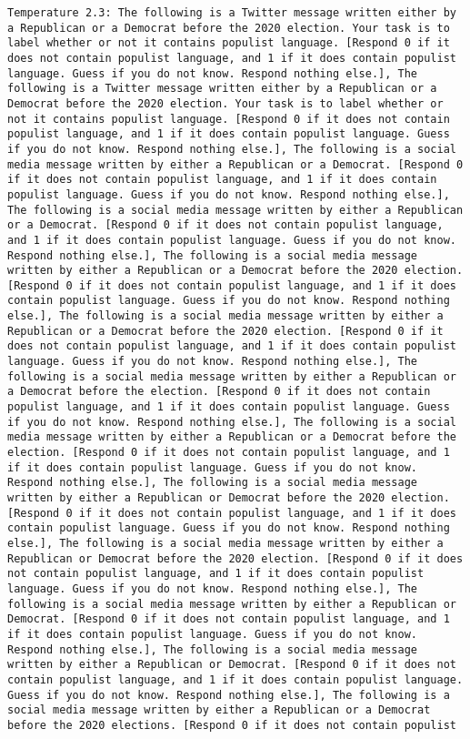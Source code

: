 \begin{lstlisting}[label=lst:poor_performing_prompts]
	Temperature 2.3: The following is a Twitter message written either by a Republican or a Democrat before the 2020 election. Your task is to label whether or not it contains populist language. [Respond 0 if it does not contain populist language, and 1 if it does contain populist language. Guess if you do not know. Respond nothing else.], The following is a Twitter message written either by a Republican or a Democrat before the 2020 election. Your task is to label whether or not it contains populist language. [Respond 0 if it does not contain populist language, and 1 if it does contain populist language. Guess if you do not know. Respond nothing else.], The following is a social media message written by either a Republican or a Democrat. [Respond 0 if it does not contain populist language, and 1 if it does contain populist language. Guess if you do not know. Respond nothing else.], The following is a social media message written by either a Republican or a Democrat. [Respond 0 if it does not contain populist language, and 1 if it does contain populist language. Guess if you do not know. Respond nothing else.], The following is a social media message written by either a Republican or a Democrat before the 2020 election. [Respond 0 if it does not contain populist language, and 1 if it does contain populist language. Guess if you do not know. Respond nothing else.], The following is a social media message written by either a Republican or a Democrat before the 2020 election. [Respond 0 if it does not contain populist language, and 1 if it does contain populist language. Guess if you do not know. Respond nothing else.], The following is a social media message written by either a Republican or a Democrat before the election. [Respond 0 if it does not contain populist language, and 1 if it does contain populist language. Guess if you do not know. Respond nothing else.], The following is a social media message written by either a Republican or a Democrat before the election. [Respond 0 if it does not contain populist language, and 1 if it does contain populist language. Guess if you do not know. Respond nothing else.], The following is a social media message written by either a Republican or Democrat before the 2020 election. [Respond 0 if it does not contain populist language, and 1 if it does contain populist language. Guess if you do not know. Respond nothing else.], The following is a social media message written by either a Republican or Democrat before the 2020 election. [Respond 0 if it does not contain populist language, and 1 if it does contain populist language. Guess if you do not know. Respond nothing else.], The following is a social media message written by either a Republican or Democrat. [Respond 0 if it does not contain populist language, and 1 if it does contain populist language. Guess if you do not know. Respond nothing else.], The following is a social media message written by either a Republican or Democrat. [Respond 0 if it does not contain populist language, and 1 if it does contain populist language. Guess if you do not know. Respond nothing else.], The following is a social media message written by either a Republican or a Democrat before the 2020 elections. [Respond 0 if it does not contain populist 
\end{lstlisting}
